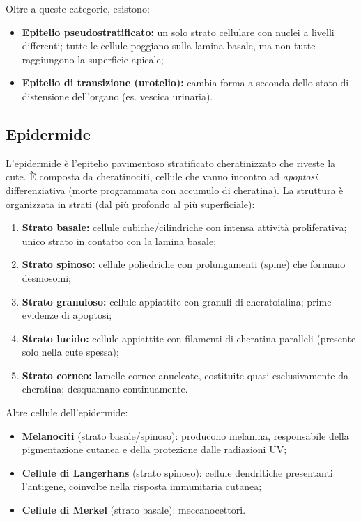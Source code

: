 \documentclass[11pt,a4paper,openright,twoside]{book}
\theoremstyle{definition}
\theoremstyle{plain}
\theoremstyle{remark}
\begin{document}
Oltre a queste categorie, esistono:
\begin{itemize}
  \item \textbf{Epitelio pseudostratificato:} un solo strato cellulare con nuclei a livelli differenti; tutte le cellule poggiano sulla lamina basale, ma non tutte raggiungono la superficie apicale;
  \item \textbf{Epitelio di transizione (urotelio):} cambia forma a seconda dello stato di distensione dell'organo (es. vescica urinaria).
\end{itemize}

\subsection{Epidermide}

L'epidermide è l'epitelio pavimentoso stratificato cheratinizzato che riveste la cute. È composta da cheratinociti, cellule che vanno incontro ad \textit{apoptosi} differenziativa (morte programmata con accumulo di cheratina). La struttura è organizzata in strati (dal più profondo al più superficiale):

\begin{enumerate}
  \item \textbf{Strato basale:} cellule cubiche/cilindriche con intensa attività proliferativa; unico strato in contatto con la lamina basale;
  \item \textbf{Strato spinoso:} cellule poliedriche con prolungamenti (spine) che formano desmosomi;
  \item \textbf{Strato granuloso:} cellule appiattite con granuli di cheratoialina; prime evidenze di apoptosi;
  \item \textbf{Strato lucido:} cellule appiattite con filamenti di cheratina paralleli (presente solo nella cute spessa);
  \item \textbf{Strato corneo:} lamelle cornee anucleate, costituite quasi esclusivamente da cheratina; desquamano continuamente.
\end{enumerate}

Altre cellule dell'epidermide:
\begin{itemize}
  \item \textbf{Melanociti} (strato basale/spinoso): producono melanina, responsabile della pigmentazione cutanea e della protezione dalle radiazioni UV;
  \item \textbf{Cellule di Langerhans} (strato spinoso): cellule dendritiche presentanti l'antigene, coinvolte nella risposta immunitaria cutanea;
  \item \textbf{Cellule di Merkel} (strato basale): meccanocettori.
\end{itemize}
\end{document}
